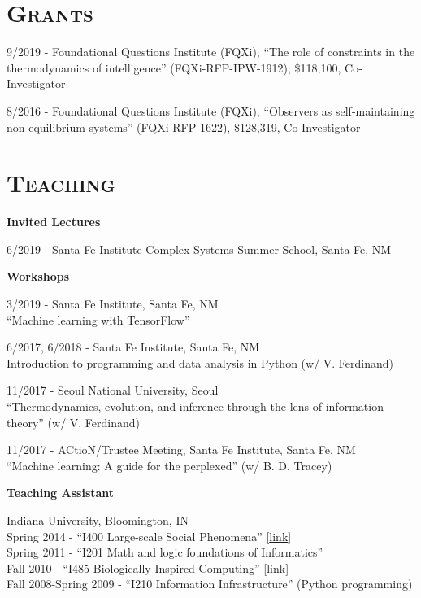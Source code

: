 \documentclass[margin,line,centered]{res}
\begin{document}
\begin{resume}
\section{\textsc{Grants}}
9/2019 - Foundational Questions Institute (FQXi), 
``The role of constraints in the thermodynamics of intelligence'' (FQXi-RFP-IPW-1912),
\$118,100, Co-Investigator

8/2016 - Foundational Questions Institute (FQXi), 
``Observers as self-maintaining non-equilibrium systems'' (FQXi-RFP-1622),
\$128,319, Co-Investigator


\section{\textsc{Teaching}}

\textbf{Invited Lectures}

6/2019 - Santa Fe Institute Complex Systems Summer School, Santa Fe, NM

\vspace{5pt}

\textbf{Workshops}

3/2019 - Santa Fe Institute, Santa Fe, NM\\
``Machine learning with TensorFlow''

6/2017, 6/2018 - Santa Fe Institute, Santa Fe, NM\\
Introduction to programming and data analysis in Python (w/ V. Ferdinand)

11/2017 - Seoul National University, Seoul \\
``Thermodynamics, evolution, and inference through the lens of information theory'' (w/ V. Ferdinand)

11/2017 - ACtioN/Trustee Meeting, Santa Fe Institute, Santa Fe, NM\\
``Machine learning: A guide for the perplexed'' (w/ B. D. Tracey)


\vspace{5pt}

\textbf{Teaching Assistant}

Indiana University, Bloomington, IN\\
\hangindent=10pt Spring 2014 - ``I400 Large-scale Social Phenomena'' {[}\href{http://tuvalu.santafe.edu/~simon/page11/page11.html}{link}{]} \\
Spring 2011 - ``I201 Math and logic foundations of Informatics''\\
Fall 2010 - ``I485 Biologically Inspired Computing'' {[}\href{http://www.informatics.indiana.edu/rocha/i-bic/}{link}{]}\\
Fall 2008-Spring 2009 - ``I210 Information Infrastructure'' (Python programming)


\end{resume}
\end{document}
